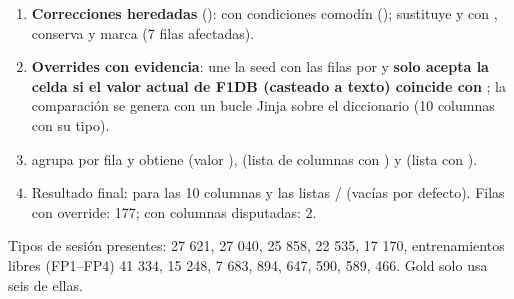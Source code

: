 \begin{enumerate}
\item \textbf{Correcciones heredadas} ():  con condiciones comodín (); sustituye  y  con , conserva  y marca  (7 filas afectadas).
\item \textbf{Overrides con evidencia}:  une la seed con las filas por  y \textbf{solo acepta la celda si el valor actual de F1DB (casteado a texto) coincide con }; la comparación se genera con un bucle Jinja sobre el diccionario  (10 columnas con su tipo).
\item {} agrupa por fila y obtiene  (valor ),  (lista de columnas con ) y  (lista con ).
\item Resultado final:  para las 10 columnas y las listas  /  (vacías por defecto). Filas con override: 177; con columnas disputadas: 2.
\end{enumerate}

Tipos de sesión presentes:  27 621,  27 040,  25 858,  22 535,  17 170, entrenamientos libres (FP1–FP4) 41 334,  15 248,  7 683,  894,  647,  590,  589,  466. Gold solo usa seis de ellas.

